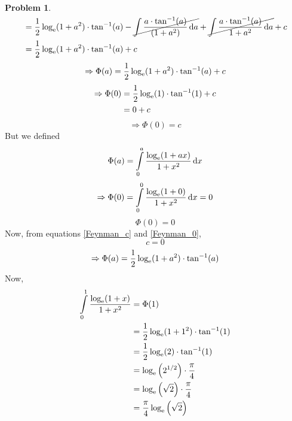 \documentclass[14]{article}
\theoremstyle{definition}
\newtheorem{prob}{Problem}
\theoremstyle{case}
\begin{document}
\begin{prob}
\begin{align*}
&= \dfrac12 \log_{\rm e}(1+a^2) \cdot \tan^{-1}(a) - \cancel{\int \dfrac{a \cdot \tan^{-1}(a)}{(1+a^2)} \dif a} + \cancel{\int \dfrac{a \cdot \tan^{-1}(a)}{1+a^2} \dif a} + c\\
&= \dfrac12 \log_{\rm e}(1+a^2) \cdot \tan^{-1}(a) + c
\end{align*}
\pagebreak
\[\Rightarrow \Phi(a) = \dfrac12 \log_{\rm e}(1+a^2) \cdot \tan^{-1}(a) + c\]
\begin{align*}
\Rightarrow \Phi(0) &= \dfrac12 \log_{\rm e}(1) \cdot \tan^{-1}(1) + c\\ &= 0 + c
\end{align*}
\begin{equation}\label{Feynman_c}
\Rightarrow\Phi(0) = c
\end{equation}
But we defined
\[\Phi(a) = \int\limits_0^a \dfrac{\log_{\rm e}(1+ax)}{1+x^2} \dif x\]
\[\Rightarrow \Phi(0) = \int\limits_0^0 \dfrac{\log_{\rm e}(1+0)}{1+x^2} \dif x = 0\]
\begin{equation}\label{Feynman_0}
\Phi(0) = 0
\end{equation}
Now, from equations \eqref{Feynman_c} and \eqref{Feynman_0},
\[c = 0\]
\[\Rightarrow \Phi(a) = \dfrac12 \log_{\rm e}(1+a^2) \cdot \tan^{-1}(a)\]
Now,
\begin{align*}
\int\limits_0^1 \dfrac{\log_{\rm e}(1+x)}{1+x^2} &= \Phi(1)\\
&= \dfrac12 \log_{\rm e}(1+1^2) \cdot \tan^{-1}(1)\\
&= \dfrac12 \log_{\rm e}(2) \cdot \tan^{-1}(1)\\
&= \log_{\rm e}\left(2^{1/2}\right) \cdot \dfrac{\pi}{4}\\
&= \log_{\rm e}\left(\sqrt2\right) \cdot \dfrac{\pi}{4}\\
&= \dfrac{\pi}{4} \log_{\rm e}\left(\sqrt2\right)
\end{align*}
\end{prob}
\pagebreak
\end{document}
